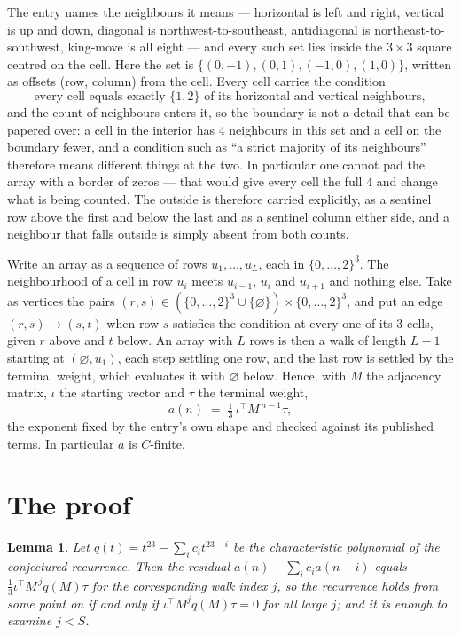 \documentclass[11pt,a4paper]{article}
\theoremstyle{plain}
\newtheorem{lemma}[theorem]{Lemma}
\theoremstyle{definition}
\begin{document}
The entry names the neighbours it means --- horizontal is left and right, vertical is up and
down, diagonal is northwest-to-southeast, antidiagonal is northeast-to-southwest, king-move is
all eight --- and every such set lies inside the $3\times3$ square centred on the cell. Here
the set is $\{(0,-1), (0,1), (-1,0), (1,0)\}$, written as offsets (row, column) from the cell. Every cell carries
the condition
\[
\text{every cell equals exactly }\{1,2\}\text{ of its horizontal and vertical neighbours},
\]
and the count of neighbours enters it, so the boundary is not a detail that can be papered
over: a cell in the interior has $4$ neighbours in this set and a cell on the boundary
fewer, and a condition such as ``a strict majority of its neighbours'' therefore means
different things at the two. In particular one cannot pad the array with a border of zeros ---
that would give every cell the full $4$ and change what is being counted. The outside is
therefore carried
explicitly, as a sentinel row above the first and below the last and as a sentinel column
either side, and a neighbour that falls outside is simply absent from both counts.

Write an array as a sequence of rows $u_1,\dots,u_L$, each in
$\{0,\dots,2\}^{3}$. The neighbourhood of a cell in row $u_i$ meets $u_{i-1}$,
$u_i$ and $u_{i+1}$ and nothing else. Take as vertices the pairs
$(r,s)\in(\{0,\dots,2\}^{3}\cup\{\varnothing\})\times\{0,\dots,2\}^{3}$,
and put an edge $(r,s)\to(s,t)$ when row $s$ satisfies the condition at every one of its
$3$ cells, given $r$ above and $t$ below. An array with $L$ rows is then a walk of length
$L-1$ starting at $(\varnothing,u_1)$, each step settling one row, and the last row is
settled by the terminal weight, which evaluates it with $\varnothing$ below. Hence,
with $M$ the adjacency matrix, $\iota$ the starting vector and $\tau$ the terminal weight,
\[
a(n)\;=\;\tfrac1{3}\,\iota^{\!\top}M^{\,n-1}\tau ,
\]
the exponent fixed by the entry's own shape and checked against its published terms. In
particular $a$ is $C$-finite.

\section{The proof}

\begin{lemma}\label{lem:crit}
Let $q(t)=t^{23}-\sum_i c_it^{23-i}$ be the characteristic polynomial of the
conjectured recurrence. Then the residual $a(n)-\sum_ic_ia(n-i)$ equals
$\tfrac1{3}\iota^{\!\top}M^{\,j}q(M)\tau$ for the corresponding walk index $j$, so the
recurrence holds from some point on if and only if $\iota^{\!\top}M^{j}q(M)\tau=0$ for all
large $j$; and it is enough to examine $j<S$.
\end{lemma}
\end{document}
